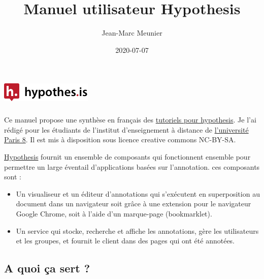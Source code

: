 \documentclass[
]{book}
\title{Manuel utilisateur Hypothesis}
\author{Jean-Marc Meunier}
\date{2020-07-07}
\providecommand{\tightlist}{%
  \setlength{\itemsep}{0pt}\setlength{\parskip}{0pt}}
\begin{document}
\frontmatter
\maketitle

{
\setcounter{tocdepth}{1}
\tableofcontents
}
\mainmatter
\hypertarget{section}{%
\chapter*{\texorpdfstring{\protect\includegraphics{img/hypothesislogomark.png}}{}}\label{section}}

Ce manuel propose une synthèse en français des \href{https://web.hypothes.is/help-categories/tutorials/}{tutoriels pour hypothesis}. Je l'ai rédigé pour les étudiants de l'institut d'enseignement à distance de \href{https://www.univ-paris8.fr/}{l'université Paris 8}. Il est mis à disposition sous licence creative commons NC-BY-SA.

\href{https://web.hypothes.is/}{Hypothesis} fournit un ensemble de composants qui fonctionnent ensemble pour permettre un large éventail d'applications basées sur l'annotation. ces composants sont :

\begin{itemize}
\tightlist
\item
  Un visualiseur et un éditeur d'annotations qui s'exécutent en superposition au document dans un navigateur soit grâce à une extension pour le navigateur Google Chrome, soit à l'aide d'un marque-page (bookmarklet).
\item
  Un service qui stocke, recherche et affiche les annotations, gère les utilisateurs et les groupes, et fournit le client dans des pages qui ont été annotées.
\end{itemize}

\hypertarget{a-quoi-uxe7a-sert}{%
\section*{A quoi ça sert ?}\label{a-quoi-uxe7a-sert}}
\end{document}
